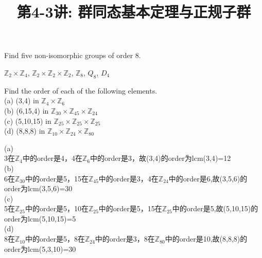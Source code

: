 \documentclass[a4paper, justified]{tufte-handout}
\title{第4-3讲: 群同态基本定理与正规子群}
\date{\zhtoday} %
\begin{document}
\maketitle
\noplagiarism %
\begin{abstract}
\end{abstract}
\beginrequired

\begin{problem}[TJ 9-11]
Find five non-isomorphic groups of order 8.
\end{problem}

\begin{solution}
$\mathbb{Z}_2\times \mathbb{Z}_4$, $\mathbb{Z}_2\times\mathbb{Z}_2\times\mathbb{Z}_2$, $\mathbb{Z}_8$, $Q_8$, $D_4$
\end{solution}

\begin{problem}[TJ 9-16]
Find the order of each of the following elements.\\
(a) (3,4) in $\mathbb{Z}_4 \times \mathbb{Z}_6$\\
(b) (6,15,4) in $\mathbb{Z}_{30} \times \mathbb{Z}_{45}  \times \mathbb{Z}_{24}$\\
(c) (5,10,15) in $\mathbb{Z}_{25} \times \mathbb{Z}_{25}  \times \mathbb{Z}_{25}$ \\
(d) (8,8,8) in $\mathbb{Z}_{10} \times \mathbb{Z}_{24}  \times \mathbb{Z}_{80}$

\end{problem}

\begin{solution}
(a)\\
3在$\mathbb{Z}_4$中的order是4，4在$\mathbb{Z}_6$中的order是3，故(3,4)的order为lcm(3,4)=12\\
(b)\\
6在$\mathbb{Z}_{30}$中的order是5，15在$\mathbb{Z}_{45}$中的order是3，4在$\mathbb{Z}_{24}$中的order是6,故(3,5,6)的order为lcm(3,5,6)=30\\
(c)\\
5在$\mathbb{Z}_{25}$中的order是5，10在$\mathbb{Z}_{25}$中的order是5，15在$\mathbb{Z}_{25}$中的order是5,故(5,10,15)的order为lcm(5,10,15)=5\\
(d)\\
8在$\mathbb{Z}_{10}$中的order是5，8在$\mathbb{Z}_{24}$中的order是3，8在$\mathbb{Z}_{80}$中的order是10,故(8,8,8)的order为lcm(5,3,10)=30\\
\end{solution}
\end{document}
